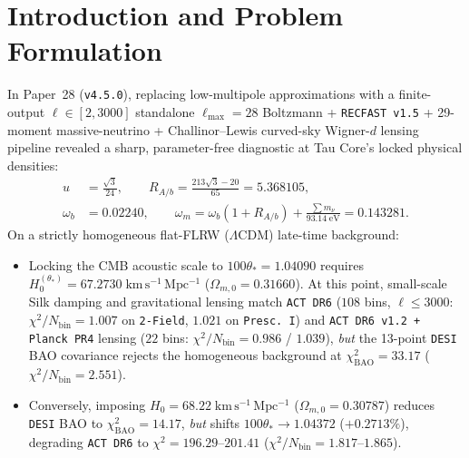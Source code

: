 \documentclass[11pt,a4paper]{article}
\begin{document}
\section{Introduction and Problem Formulation}
In Paper~28 (\texttt{v4.5.0}), replacing low-multipole approximations with a finite-output $\ell \in [2, 3000]$ standalone $\ell_{\max}=28$ Boltzmann + \texttt{RECFAST v1.5} + 29-moment massive-neutrino + Challinor--Lewis curved-sky Wigner-$d$ lensing pipeline revealed a sharp, parameter-free diagnostic at Tau Core's locked physical densities:
\begin{equation}
\begin{aligned}
    u &= \frac{\sqrt{3}}{24}, \qquad R_{A/b} = \frac{213\sqrt{3}-20}{65} = 5.368105, \\
    \omega_b &= 0.02240, \qquad \omega_m = \omega_b(1 + R_{A/b}) + \frac{\sum m_\nu}{93.14\;\mathrm{eV}} = 0.143281.
\end{aligned}
\label{eq:locked-densities}
\end{equation}
On a strictly homogeneous flat-FLRW ($\Lambda$CDM) late-time background:
\begin{itemize}
    \item Locking the CMB acoustic scale to $100\theta_* = 1.04090$ requires $H_0^{(\theta_*)} = 67.2730\;\mathrm{km\,s^{-1}\,Mpc^{-1}}$ ($\Omega_{m,0} = 0.31660$). At this point, small-scale Silk damping and gravitational lensing match \texttt{ACT DR6} ($108$ bins, $\ell \le 3000$: $\chi^2/N_{\mathrm{bin}} = 1.007$ on \texttt{2-Field}, $1.021$ on \texttt{Presc.~I}) and \texttt{ACT DR6 v1.2 + Planck PR4} lensing ($22$ bins: $\chi^2/N_{\mathrm{bin}} = 0.986$ / $1.039$), \emph{but} the 13-point \texttt{DESI} BAO covariance rejects the homogeneous background at $\chi^2_{\mathrm{BAO}} = 33.17$ ($\chi^2/N_{\mathrm{bin}} = 2.551$).
    \item Conversely, imposing $H_0 = 68.22\;\mathrm{km\,s^{-1}\,Mpc^{-1}}$ ($\Omega_{m,0} = 0.30787$) reduces \texttt{DESI} BAO to $\chi^2_{\mathrm{BAO}} = 14.17$, \emph{but} shifts $100\theta_* \to 1.04372$ ($+0.2713\%$), degrading \texttt{ACT DR6} to $\chi^2 = 196.29\text{--}201.41$ ($\chi^2/N_{\mathrm{bin}} = 1.817\text{--}1.865$).
\end{itemize}
\end{document}
